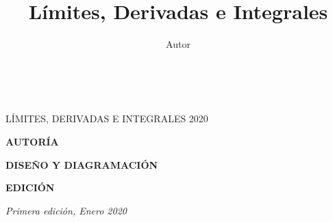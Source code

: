 \documentclass[justified,twoside,symmetric,explicit,letterpaper]{tufte-book} %
\title[L\'imites, Derivadas e Integrales]{L\'imites, Derivadas e Integrales}
\author{Autor} %
\numberwithin{figure}{chapter}
\begin{document}
\frontmatter







\maketitle %


\newpage
\begin{fullwidth}
~\vfill
\thispagestyle{empty}
\setlength{\parindent}{0pt}
\setlength{\parskip}{\baselineskip}

\begin{Large}L\'IMITES, DERIVADAS E INTEGRALES 2020\end{Large}\bigskip


\par\textbf{AUTORÍA}\medskip



\par\textbf{DISEÑO Y DIAGRAMACIÓN}\medskip



\par\textbf{EDICIÓN}\medskip










\par{}

\par\textit{Primera edición, Enero 2020}

\end{fullwidth}
\end{document}
